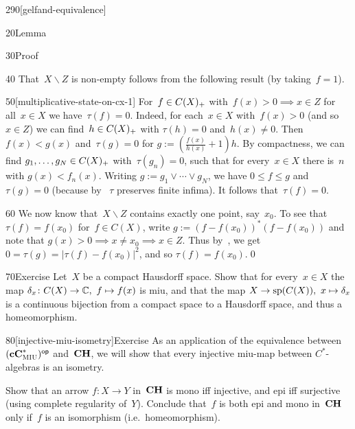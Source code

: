\begin{parsec}{290}[gelfand-equivalence]
\begin{point}{20}{Lemma}
\begin{point}{30}{Proof}
\begin{point}{40}
That~$X\backslash Z$ is non-empty
follows from the following result (by taking~$f=1$).
\end{point}
\begin{point}{50}[multiplicative-state-on-cx-1]%
For~$f\in C(X)_{+}$
with~$f(x)> 0 \implies x\in Z$ for all~$x\in X$
we have~$\tau(f)=0$.
Indeed, for each~$x\in X$ with~$f(x)>0$
(and so~$x\in Z$)
we can find~$h\in C(X)_{+}$
with $\tau(h)=0$ and~$h(x)\neq 0$.
Then~$f(x)< g(x)$
and~$\tau(g)=0$
for $g:=(\frac{f(x)}{h(x)}+1)h$.
By compactness,
we can find $g_1,\dotsc,g_N\in C(X)_{+}$
with~$\tau(g_n)=0$,
such that for every~$x\in X$
there is~$n$ with $g(x)<f_n(x)$.
Writing $g:=g_1\vee \dotsb \vee g_N$,
we have $0\leq f\leq g$ and~$\tau(g)=0$
(because by~
$\tau$ preserves finite infima).
It follows that~$\tau(f)=0$.
\end{point}
\begin{point}{60}%
We now know that~$X\backslash Z$ contains exactly
one point, say~$x_0$.
To see that~$\tau(f)=f(x_0)$
for~$f\in C(X)$,
write $g:=(f-f(x_0))^*(f-f(x_0))$
and note that $g(x)>0\implies x\neq x_0\implies  x\in Z$.
Thus by~,
we get $0=\tau(g)=\left|\tau(f)-f(x_0)\right|^2$,
and so $\tau(f)=f(x_0)$.\qed
\end{point}
\end{point}
\end{point}
\begin{point}{70}{Exercise}%
Let~$X$ be a compact Hausdorff space.
Show that for every~$x\in X$
the map $\delta_x\colon C(X)\to \mathbb{C},\ f\mapsto f(x)$
is miu,
and that the map $X\to \mathrm{sp}(C(X)),\ x\mapsto \delta_x$
is a continuous bijection
from a compact space to a Hausdorff space,
and thus a homeomorphism.
\end{point}
\begin{point}{80}[injective-miu-isometry]{Exercise}%
As an application of the equivalence
between ${(\mathbf{cC}^*_{\text{\textsc{MIU}}})}{^{\mathsf{op}}}$
and~$\mathbf{CH}$,
we will show that every injective miu-map
between $C^*$-algebras
is an isometry.

Show that an arrow $f\colon X\to Y$
in~$\mathbf{CH}$ is mono iff injective, and epi iff surjective
(using complete regularity of~$Y$).
Conclude that~$f$ is both epi and mono in~$\mathbf{CH}$
only if~$f$ is an isomorphism (i.e.~homeomorphism).


\end{point}
\end{parsec}
